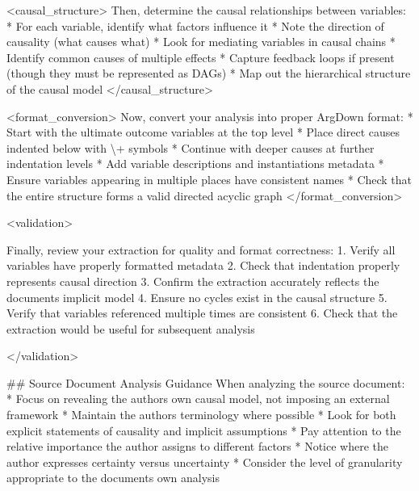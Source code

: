 \documentclass[
  11pt,
  letterpaper,
]{book}
\newenvironment{Shaded}{\begin{snugshade}}{\end{snugshade}}
\newcommand{\ErrorTok}[1]{\textcolor[rgb]{0.68,0.00,0.00}{#1}}
\newcommand{\StringTok}[1]{\textcolor[rgb]{0.13,0.47,0.30}{#1}}
\begin{document}
\begin{Shaded}
\begin{Highlighting}[]
\StringTok{\textless{}causal\_structure\textgreater{}}
\StringTok{Then, determine the causal relationships between variables:}
\StringTok{* For each variable, identify what factors influence it}
\StringTok{* Note the direction of causality (what causes what)}
\StringTok{* Look for mediating variables in causal chains}
\StringTok{* Identify common causes of multiple effects}
\StringTok{* Capture feedback loops if present (though they must be represented as DAGs)}
\StringTok{* Map out the hierarchical structure of the causal model}
\StringTok{\textless{}/causal\_structure\textgreater{}}

\StringTok{\textless{}format\_conversion\textgreater{}}
\StringTok{Now, convert your analysis into proper ArgDown format:}
\StringTok{* Start with the ultimate outcome variables at the top level}
\StringTok{* Place direct causes indented below with }\ErrorTok{\textbackslash{}}\StringTok{+ symbols}
\StringTok{* Continue with deeper causes at further indentation levels}
\StringTok{* Add variable descriptions and instantiations metadata}
\StringTok{* Ensure variables appearing in multiple places have consistent names}
\StringTok{* Check that the entire structure forms a valid directed acyclic graph}
\StringTok{\textless{}/format\_conversion\textgreater{}}

\StringTok{\textless{}validation\textgreater{}}

\StringTok{Finally, review your extraction for quality and format correctness:}
\StringTok{1. Verify all variables have properly formatted metadata}
\StringTok{2. Check that indentation properly represents causal direction}
\StringTok{3. Confirm the extraction accurately reflects the document\textquotesingle{}s implicit model}
\StringTok{4. Ensure no cycles exist in the causal structure}
\StringTok{5. Verify that variables referenced multiple times are consistent}
\StringTok{6. Check that the extraction would be useful for subsequent analysis}

\StringTok{\textless{}/validation\textgreater{}}


\StringTok{\#\# Source Document Analysis Guidance}
\StringTok{When analyzing the source document:}
\StringTok{* Focus on revealing the author\textquotesingle{}s own causal model, not imposing an external framework}
\StringTok{* Maintain the author\textquotesingle{}s terminology where possible}
\StringTok{* Look for both explicit statements of causality and implicit assumptions}
\StringTok{* Pay attention to the relative importance the author assigns to different factors}
\StringTok{* Notice where the author expresses certainty versus uncertainty}
\StringTok{* Consider the level of granularity appropriate to the document\textquotesingle{}s own analysis}


\end{Highlighting}
\end{Shaded}
\end{document}
